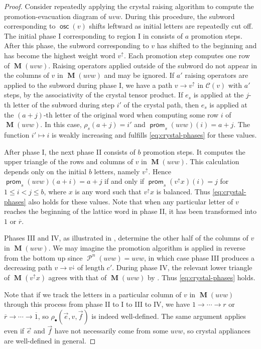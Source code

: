 \documentclass{amsart}
\theoremstyle{definition}
\theoremstyle{remark}
\numberwithin{equation}{section}
\DeclareMathOperator{\osc}{\mathsf{osc}}
\DeclareMathOperator{\prom}{\mathsf{prom}}
\DeclareMathOperator{\promotion}{\mathcal{P}}
\DeclareMathOperator{\PM}{\mathbf{M}}
\begin{document}
\begin{proof}
  Consider repeatedly applying the crystal raising algorithm to compute the promotion-evacuation diagram of $uvw$. During this procedure, the subword corresponding to $\osc(v)$ shifts leftward as initial letters are repeatedly cut off. The initial phase I corresponding to region I in  consists of $a$ promotion steps. After this phase, the subword corresponding to $v$ has shifted to the beginning and has become the highest weight word $v^\uparrow$. Each promotion step computes one row of $\PM(uvw)$. Raising operators applied outside of the subword do not appear in the columns of $v$ in $\PM(uvw)$ and may be ignored. If $a'$ raising operators are applied to the subword during phase I, we have a path $v \to v^\uparrow$ in $\mathcal{C}(v)$ with $a'$ steps, by the associativity of the crystal tensor product. If $e_s$ is applied at the $j$-th letter of the subword during step $i'$ of the crystal path, then $e_s$ is applied at the $(a+j)$-th letter of the original word when computing some row $i$ of $\PM(uvw)$. In this case, $\rho_s(a+j) = i'$ and $\prom_s(uvw)(i) = a+j$. The function $i' \mapsto i$ is weakly increasing and fulfills \eqref{eq:crystal-phases} for these values.

  After phase I, the next phase II consists of $b$ promotion steps. It computes the upper triangle of the rows and columns of $v$ in $\PM(uvw)$. This calculation depends only on the initial $b$ letters, namely $v^\uparrow$. Hence $\prom_s(uvw)(a+i) = a+j$ if and only if $\prom_s(v^\uparrow x)(i) = j$ for $1 \leq i < j \leq b$, where $x$ is any word such that $v^\uparrow x$ is balanced. Thus \eqref{eq:crystal-phases} also holds for these values. Note that when any particular letter of $v$ reaches the beginning of the lattice word in phase II, it has been transformed into $1$ or $\overline{r}$.

  Phases III and IV, as illustrated in , determine the other half of the columns of $v$ in $\PM(uvw)$. We may imagine the promotion algorithm is applied in reverse from the bottom up since $\promotion^n(uvw) = uvw$, in which case phase III produces a decreasing path $v \to v^\downarrow$ of length $c'$. During phase IV, the relevant lower triangle of $\PM(v^\uparrow x)$ agrees with that of $\PM(uvw)$ by \cite[Thm.~8.25]{fluctuating-paper}. Thus \eqref{eq:crystal-phases} holds.

  Note that if we track the letters in a particular column of $v$ in $\PM(uvw)$ through this process from phase II to I to III to IV, we have $1 \to \cdots \to r$ or $\overline{r} \to \cdots \to \overline{1}$, so $\rho_\bullet(\vec{e}, v, \vec{f})$ is indeed well-defined. The same argument applies even if $\vec{e}$ and $\vec{f}$ have not necessarily come from some $uvw$, so crystal appliances are well-defined in general.
\end{proof}
\end{document}
